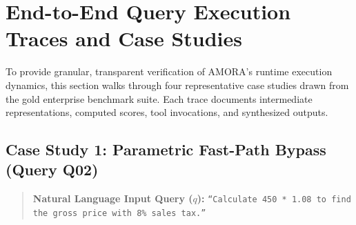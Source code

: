 \section{End-to-End Query Execution Traces and Case Studies}
\label{sec:case_studies}

To provide granular, transparent verification of AMORA's runtime execution dynamics, this section walks through four representative case studies drawn from the gold enterprise benchmark suite. Each trace documents intermediate representations, computed scores, tool invocations, and synthesized outputs.

\subsection{Case Study 1: Parametric Fast-Path Bypass (Query Q02)}
\label{subsec:trace_q02}

\begin{quote}
\textbf{Natural Language Input Query ($q$):}  
\texttt{``Calculate 450 * 1.08 to find the gross price with 8\% sales tax.''}
\end{quote}

